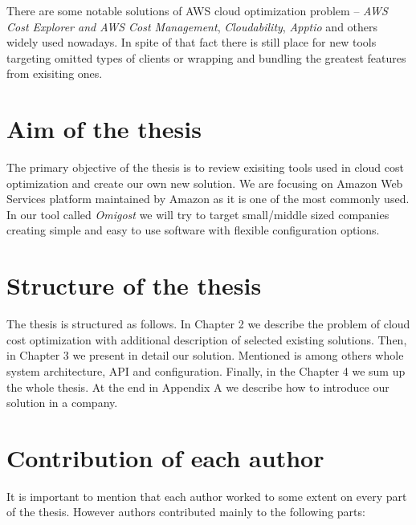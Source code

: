 \documentclass[licencjacka,en]{thesisclass}
\begin{document}
    There are some notable solutions of AWS cloud optimization problem -- \textit{AWS Cost Explorer and AWS Cost Management}, \textit{Cloudability}, \textit{Apptio} and others widely used nowadays. In spite of that fact there is still place for new tools targeting omitted types of clients or wrapping and bundling the greatest features from exisiting ones.

    \section{Aim of the thesis}

    The primary objective of the thesis is to review exisiting tools used in cloud cost optimization and create our own new solution. We are focusing on Amazon Web Services platform maintained by Amazon as it is one of the most commonly used.
    In our tool called \textit{Omigost} we will try to target small/middle sized companies creating simple and easy to use software with flexible configuration options.

    \section{Structure of the thesis}

    The thesis is structured as follows. In Chapter 2 we describe the problem of cloud cost optimization with additional description of selected existing solutions. Then, in Chapter 3 we present in detail our solution. Mentioned is among others whole system architecture, API and configuration. Finally, in the Chapter 4 we sum up the whole thesis. At the end in Appendix A we describe how to introduce our solution in a company.

    \section{Contribution of each author}

    It is important to mention that each author worked to some extent on every part of the thesis. However authors contributed mainly to the following parts:
\end{document}
